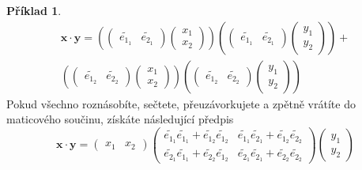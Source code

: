 \documentclass[a5paper,12pt]{amsbook}
\theoremstyle{definition}
\newtheorem{example}{Příklad}[chapter]
\newcommand{\myvec}[1]{\bm{#1}}
\begin{document}
\begin{example}
\begin{equation*}
\begin{split}
\myvec{x}\cdot\myvec{y} =
\left(
  \left(\begin{array}{cc}\widetilde{e_{1_1}} & \widetilde{e_{2_1}}\end{array}\right)
  \left(\begin{array}{c}x_1 \\ x_2\end{array}\right)
\right)
\left(
  \left(\begin{array}{cc}\widetilde{e_{1_1}} & \widetilde{e_{2_1}}\end{array}\right)
  \left(\begin{array}{c}y_1 \\ y_2\end{array}\right)
\right) + \\
\left(
  \left(\begin{array}{cc}\widetilde{e_{1_2}} & \widetilde{e_{2_2}}\end{array}\right)
  \left(\begin{array}{c}x_1 \\ x_2\end{array}\right)
\right)
\left(
  \left(\begin{array}{cc}\widetilde{e_{1_2}} & \widetilde{e_{2_2}}\end{array}\right)
  \left(\begin{array}{c}y_1 \\ y_2\end{array}\right)
\right)
\end{split}
\end{equation*}
Pokud všechno roznásobíte, sečtete, přeuzávorkujete a zpětně vrátíte do maticového
součinu, získáte následující předpis
\begin{equation*}
\myvec{x}\cdot\myvec{y} =
\left(\begin{array}{cc}x_1 & x_2\end{array}\right)
\left(\begin{array}{cc}
  \widetilde{e_{1_1}}\widetilde{e_{1_1}} + \widetilde{e_{1_2}}\widetilde{e_{1_2}} &
  \widetilde{e_{1_1}}\widetilde{e_{2_1}} + \widetilde{e_{1_2}}\widetilde{e_{2_2}} \\
  \widetilde{e_{2_1}}\widetilde{e_{1_1}} + \widetilde{e_{2_2}}\widetilde{e_{1_2}} &
  \widetilde{e_{2_1}}\widetilde{e_{2_1}} + \widetilde{e_{2_2}}\widetilde{e_{2_2}}
\end{array}\right)
\left(\begin{array}{c}y_1 \\ y_2\end{array}\right)
\end{equation*}

\end{example}
\end{document}
